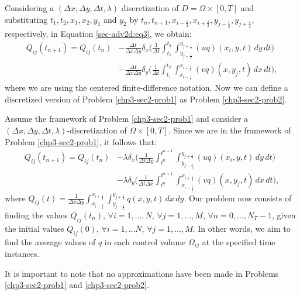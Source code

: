 Considering a $(\Delta x, \Delta y, \Delta t, \lambda)$ discretization of $D = \Omega \times [0,T]$ and
substituting $t_1, t_2, x_1, x_2, y_1$ and $y_2$ by 
$t_{n}, t_{n+1}, x_{i-\frac{1}{2}}, x_{i+\frac{1}{2}}, y_{j-\frac{1}{2}}, y_{j+\frac{1}{2}}$,
respectively, in Equation \eqref{sec-adv2d:eq3}, we obtain:
\begin{align}
	\label{sec-adv2d:eq5}
	{Q}_{ij}(t_{n+1})  = {Q}_{ij}(t_{n})
	&- \frac{\Delta t}{\Delta x \Delta y}
	\delta _x \bigg( \frac{1}{\Delta t}
	\int_{t_1}^{t_2} \int_{y_{j-\frac{1}{2}}}^{y_{j+\frac{1}{2}}} 
	{(uq)}(x_{i}, y, t)
	\,dy \,dt \bigg) \\ \nonumber
	&- \frac{\Delta t}{\Delta x \Delta y}
	\delta _y \bigg( \frac{1}{\Delta t}
	\int_{t_1}^{t_2} \int_{x_{i-\frac{1}{2}}}^{x_{i+\frac{1}{2}}} 
	{(vq)}(x, y_{j}, t)
	\,dx \,dt \bigg),
\end{align}
where we are using the centered finite-difference notation.
Now we can define a discretized version of Problem \ref{chp3-sec2-prob1} as Problem \ref{chp3-sec2-prob2}.
\begin{prob}
	\label{chp3-sec2-prob2}
	Assume the framework of Problem \ref{chp3-sec2-prob1}
	and consider a $(\Delta x, \Delta y, \Delta t, \lambda)$-discretization of $\Omega\times [0,T]$.
	Since we are in the framework of Problem \ref{chp3-sec2-prob1}, it follows that:
	\begin{align*}
		{Q}_{ij}(t_{n+1})  = {Q}_{ij}(t_{n})
		&- {\lambda}
		\delta _x \bigg( \frac{1}{\Delta t \Delta y}
		\int_{t^n}^{t^{n+1}} \int_{y_{j-\frac{1}{2}}}^{y_{j+\frac{1}{2}}} 
		{(uq)}(x_{i}, y, t)
		\,dy \,dt \bigg) \\ \nonumber
		&- {\lambda}
		\delta _y \bigg( \frac{1}{\Delta t \Delta x}
		\int_{t^n}^{t^{n+1}} \int_{x_{i-\frac{1}{2}}}^{x_{i+\frac{1}{2}}} 
		{(vq)}(x, y_{j}, t)
		\,dx \,dt \bigg),
	\end{align*}
	where ${Q}_{ij}(t) = \frac{1}{\Delta x \Delta y}
	\int_{x_{i-\frac{1}{2}}}^{x_{i+\frac{1}{2}}} 
	\int_{y_{j-\frac{1}{2}}}^{y_{j+\frac{1}{2}}} {q}(x,y,t) \,dx \,dy$.
	Our problem now consists of finding the values ${Q}_{ij}(t_{n})$, 
	$\forall i = 1, \ldots, N$, $\forall j = 1, \ldots, M$, $\forall n = 0, \ldots, N_T-1$,
    given the initial values ${Q}_{ij}(0)$, $\forall i = 1, \ldots N$, $\forall j = 1, \ldots, M$.
    In other words, we aim to find the average values of ${q}$ in each control volume $\Omega_{ij}$ at the specified time instances.
\end{prob}
It is important to note that no approximations have been made in Problems \eqref{chp3-sec2-prob1} and \eqref{chp3-sec2-prob2}. 

